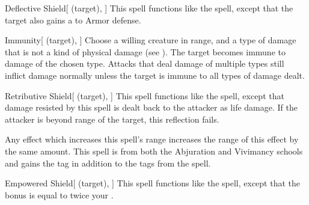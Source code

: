 \lowercase{\hypertarget{spell:Deflective Shield}{}}\label{spell:Deflective Shield}
\begin{attuneability}[\nth{3}]{\hypertarget{spell:Deflective Shield}{Deflective Shield}}[ (target), ]
This spell functions like the  spell, except that the target also gains a   to Armor defense.
\end{attuneability}
\vspace{0.25em}



\lowercase{\hypertarget{spell:Immunity}{}}\label{spell:Immunity}
\begin{attuneability}[\nth{3}]{\hypertarget{spell:Immunity}{Immunity}}[ (target), ]
Choose a willing creature in \rngclose range, and a type of damage that is not a kind of physical damage (see ).
The target becomes immune to damage of the chosen type.
Attacks that deal damage of multiple types still inflict damage normally unless the target is immune to all types of damage dealt.
\end{attuneability}
\vspace{0.25em}



\lowercase{\hypertarget{spell:Retributive Shield}{}}\label{spell:Retributive Shield}
\begin{attuneability}[\nth{3}]{\hypertarget{spell:Retributive Shield}{Retributive Shield}}[ (target), ]
This spell functions like the  spell, except that damage resisted by this spell is dealt back to the attacker as life damage.
If the attacker is beyond \rngclose range of the target, this reflection fails.

Any effect which increases this spell's range increases the range of this effect by the same amount.
This spell is from both the Abjuration and Vivimancy schools and gains the  tag in addition to the tags from the  spell.
\end{attuneability}
\vspace{0.25em}



\lowercase{\hypertarget{spell:Empowered Shield}{}}\label{spell:Empowered Shield}
\begin{attuneability}[\nth{4}]{\hypertarget{spell:Empowered Shield}{Empowered Shield}}[ (target), ]
This spell functions like the  spell, except that the bonus is equal to twice your .
\end{attuneability}
\vspace{0.25em}



